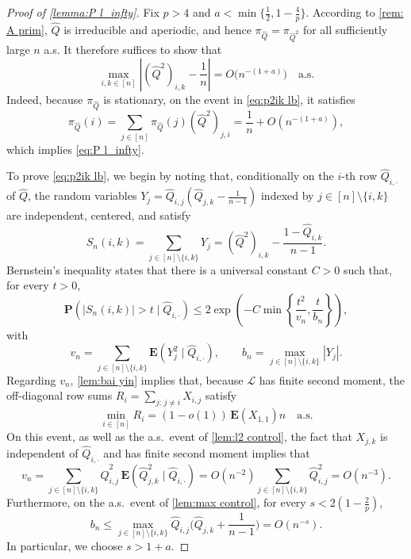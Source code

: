 \documentclass[10pt,a4paper]{amsart}
\newcommand{\E}{\mathbf{E}}
\renewcommand{\P}{\mathbf{P}}
\newcommand\wh[1]{\widehat{#1}}
\begin{document}
\begin{proof}[Proof of \cref{lemma:P l_infty}]
	Fix $p > 4$ and $a < \min\{\frac12,1-\frac{4}{p}\}$. According to \cref{rem: A prim}, $\wh{Q}$ is irreducible and aperiodic, and hence $\pi_{\wh{Q}} = \pi_{\wh{Q}^2}$ for all sufficiently large $n$ a.s. It therefore suffices to show that
\begin{equation}\label{eq:p2ik lb}
	\max_{i,k \in [n]} \left| (\wh{Q}^2)_{i,k} - \frac1n \right| = O\big(n^{-(1+a)} \big) \quad \mathrm{a.s.}
\end{equation}
Indeed, because $\pi_{\wh{Q}}$ is stationary, on the event in \cref{eq:p2ik lb}, it satisfies
\[
	\pi_{\wh{Q}} (i) = \sum_{j \in [n]} \pi_{\wh{Q}} (j) (\wh{Q}^2)_{j,i} = \frac{1}{n} + O(n^{-(1+a)}),
\]
which implies \cref{eq:P l_infty}.

To prove \cref{eq:p2ik lb}, we begin by noting that, conditionally on the $i$-th row $\wh{Q}_{i,\cdot}$ of $\wh{Q}$, the random variables $Y_j = \wh{Q}_{i,j} (\wh{Q}_{j,k} - \frac{1}{n-1})$ indexed by $j \in [n]\setminus\{i,k\}$ are independent, centered, and satisfy
\begin{equation}\label{eq:sumy}
	S_n (i,k) = \sum_{j \in [n]\setminus\{i,k\}} Y_j = (\wh{Q}^2)_{i,k} - \frac{1-\wh{Q}_{i,k}}{n-1}. 
\end{equation}
Bernstein's inequality states that there is a universal constant $C > 0$ such that, for every $t > 0$,
\begin{equation}\label{eq:bernstein}
	\P \left( |S_n (i,k)| > t \mid \wh{Q}_{i,\cdot} \right) \leq 2 \exp \left(- C \min\left\{\frac{t^2}{v_n}, \frac{t}{b_n} \right\} \right),
\end{equation}
with
\[
	v_n = \sum_{j \in [n]\setminus\{i,k\}} \E (Y_j^2 \mid \wh{Q}_{i,\cdot}), \qquad b_n = \max_{j \in [n]\setminus\{i,k\}} |Y_j|.
\]
Regarding $v_n$, \cref{lem:bai yin} implies that, because $\mathcal{L}$ has finite second moment, the off-diagonal row sums $R_i = \sum_{j:\, j \neq i} X_{i,j}$ satisfy
\[
	\min_{i \in [n]} R_i = (1-o(1))\, \E(X_{1,1}) n \quad \mathrm{a.s.}
\]
On this event, as well as the a.s.\ event of \cref{lem:l2 control}, the fact that $X_{j,k}$ is independent of $\wh{Q}_{i,\cdot}$ and has finite second moment implies that
\[
	v_n = \sum_{j \in [n]\setminus\{i,k\}} \wh{Q}^2_{i,j} \, \E (\wh{Q}^2_{j,k} \mid \wh{Q}_{i,\cdot}) = O(n^{-2}) \sum_{j \in [n]\setminus\{i,k\}} \wh{Q}^2_{i,j} = O(n^{-3}).
\]
Furthermore, on the a.s.\ event of \cref{lem:max control}, for every $s < 2(1 - \frac{2}{p})$, 
\[
	b_n \leq \max_{j \in [n]\setminus\{i,k\}} \wh{Q}_{i,j} \Big(\wh{Q}_{j,k} + \frac{1}{n-1}\Big) = O(n^{-s}).
\]
In particular, we choose $s > 1+a$.


\end{proof}
\end{document}

